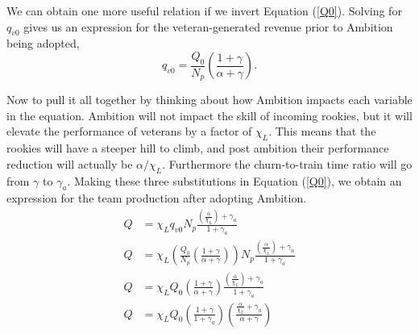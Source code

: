 \documentclass[paper=a4, fontsize=11pt abstract]{scrartcl}
\numberwithin{equation}{section}		%
\numberwithin{figure}{section}			%
\numberwithin{table}{section}				%
\begin{document}
We can obtain one more useful relation if we invert Equation (\ref{Q0}).  Solving for $q_{v0}$ gives us an expression for the veteran-generated revenue prior to Ambition being adopted,
\begin{equation}
    q_{v0} = \frac{Q_0}{N_p}\left(\frac{1 + \gamma}{\alpha + \gamma}\right).
\end{equation}

Now to pull it all together by thinking about how Ambition impacts each variable in the equation.  Ambition will not impact the skill of incoming rookies, but it will elevate the performance of veterans by a factor of $\chi_L$.  This means that the rookies will have a steeper hill to climb, and post ambition their performance reduction will actually be $\alpha / \chi_L$.  Furthermore the churn-to-train time ratio will go from $\gamma$ to $\gamma_a$.  Making these three substitutions in Equation (\ref{Q0}), we obtain an expression for the team production after adopting Ambition.
\begin{align}
    Q &= \chi_L q_{v0} N_p \frac{\left(\frac{\alpha}{\chi_L}\right) + \gamma_a}{1 + \gamma_a} \\
    Q &= \chi_L \left(     \frac{Q_0}{N_p}\left(\frac{1 + \gamma}{\alpha + \gamma}\right)             \right) N_p \frac{\left(\frac{\alpha}{\chi_L}\right) + \gamma_a}{1 + \gamma_a} \\
    Q &= \chi_L Q_0  \left(\frac{1 + \gamma}{\alpha + \gamma}  \right)  \frac{\left(\frac{\alpha}{\chi_L}\right) + \gamma_a}{1 + \gamma_a} \\
    Q &= \chi_L Q_0  \left(\frac{1+\gamma}{1 + \gamma_a}\right) \left(\frac{\frac{\alpha}{\chi_L} + \gamma_a  }{\alpha + \gamma}\right)
\end{align}






















\end{document}
